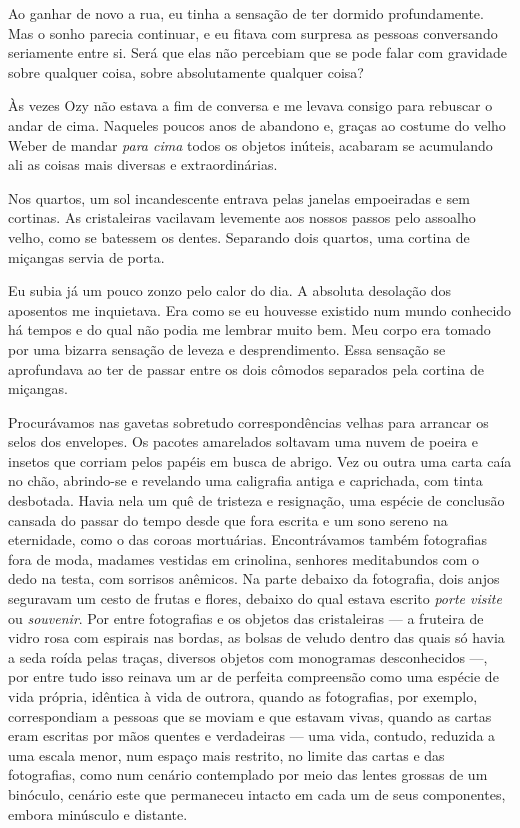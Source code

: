 Ao ganhar de novo a rua, eu tinha a sensação de ter dormido profundamente. Mas o sonho parecia continuar, e eu fitava com surpresa as pessoas conversando seriamente entre si. Será que elas não percebiam que se pode falar com gravidade sobre qualquer coisa, sobre absolutamente qualquer coisa?

Às vezes Ozy não estava a fim de conversa e me levava consigo para rebuscar o andar de cima. Naqueles poucos anos de abandono e, graças ao costume do velho Weber de mandar \textit{para cima} todos os objetos inúteis, acabaram se acumulando ali as coisas mais diversas e extraordinárias.

Nos quartos, um sol incandescente entrava pelas janelas empoeiradas e sem cortinas. As cristaleiras vacilavam levemente aos nossos passos pelo assoalho velho, como se batessem os dentes. Separando dois quartos, uma cortina de miçangas servia de porta.

Eu subia já um pouco zonzo pelo calor do dia. A absoluta desolação dos aposentos me inquietava. Era como se eu houvesse existido num mundo conhecido há tempos e do qual não podia me lembrar muito bem. Meu corpo era tomado por uma bizarra sensação de leveza e desprendimento. Essa sensação se aprofundava ao ter de passar entre os dois cômodos separados pela cortina de miçangas.

Procurávamos nas gavetas sobretudo correspondências velhas para arrancar os selos dos envelopes. Os pacotes amarelados soltavam uma nuvem de poeira e insetos que corriam pelos papéis em busca de abrigo. Vez ou outra uma carta caía no chão, abrindo-se e revelando uma caligrafia antiga e caprichada, com tinta desbotada. Havia nela um quê de tristeza e resignação, uma espécie de conclusão cansada do passar do tempo desde que fora escrita e um sono sereno na eternidade, como o das coroas mortuárias. Encontrávamos também fotografias fora de moda, madames vestidas em crinolina, senhores meditabundos com o dedo na testa, com sorrisos anêmicos. Na parte debaixo da fotografia, dois anjos seguravam um cesto de frutas e flores, debaixo do qual estava escrito \emph{porte visite} ou \emph{souvenir}. Por entre fotografias e os objetos das cristaleiras --- a fruteira de vidro rosa com espirais nas bordas, as bolsas de veludo dentro das quais só havia a seda roída pelas traças, diversos objetos com monogramas desconhecidos ---, por entre tudo isso reinava um ar de perfeita compreensão como uma espécie de vida própria, idêntica à vida de outrora, quando as fotografias, por exemplo, correspondiam a pessoas que se moviam e que estavam vivas, quando as cartas eram escritas por mãos quentes e verdadeiras --- uma vida, contudo, reduzida a uma escala menor, num espaço mais restrito, no limite das cartas e das fotografias, como num cenário contemplado por meio das lentes grossas de um binóculo, cenário este que permaneceu intacto em cada um de seus componentes, embora minúsculo e distante.

